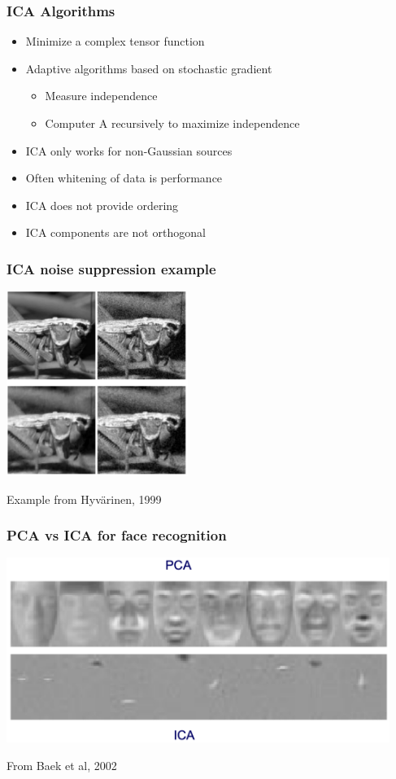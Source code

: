 \documentclass[10pt]{beamer}
\begin{document}
\begin{frame}
  \frametitle{ICA Algorithms}
  \begin{itemize}
  \item Minimize a complex tensor function
  \item Adaptive algorithms based on stochastic gradient
    \begin{itemize}
    \item Measure independence
    \item Computer A recursively to maximize independence
    \end{itemize}
  \item ICA only works for non-Gaussian sources
  \item Often whitening of data is performance
  \item ICA does not provide ordering
  \item ICA components are not orthogonal
  \end{itemize}
\end{frame}

\begin{frame}
  \frametitle{ICA noise suppression example}
  \centerline{\includegraphics[height=6cm]{ica-noise-suppression}}
  \centerline{Example from Hyv{\"a}rinen, 1999}
\end{frame}

\begin{frame}
  \frametitle{PCA vs ICA for face recognition}
  \centerline{\includegraphics[height=6cm]{pca-vs-ica}}
  \centerline{From Baek et al, 2002}
\end{frame}
\end{document}
